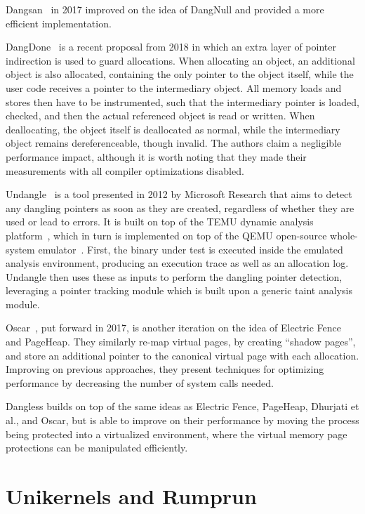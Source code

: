 Dangsan~\cite{dangsan2017} in 2017 improved on the idea of DangNull and provided a more efficient implementation.

DangDone~\cite{dangdone2018} is a recent proposal from 2018 in which an extra layer of pointer indirection is used to guard allocations. When allocating an object, an additional object is also allocated, containing the only pointer to the object itself, while the user code receives a pointer to the intermediary object. All memory loads and stores then have to be instrumented, such that the intermediary pointer is loaded, checked, and then the actual referenced object is read or written. When deallocating, the object itself is deallocated as normal, while the intermediary object remains dereferenceable, though invalid. The authors claim a negligible performance impact, although it is worth noting that they made their measurements with all compiler optimizations disabled.

Undangle~\cite{undangle2012} is a tool presented in 2012 by Microsoft Research that aims to detect any dangling pointers as soon as they are created, regardless of whether they are used or lead to errors. It is built on top of the TEMU dynamic analysis platform~\cite{bitblaze-temu2008}, which in turn is implemented on top of the QEMU open-source whole-system emulator~\cite{qemu-web}. First, the binary under test is executed inside the emulated analysis environment, producing an execution trace as well as an allocation log. Undangle then uses these as inputs to perform the dangling pointer detection, leveraging a pointer tracking module which is built upon a generic taint analysis module.

Oscar~\cite{oscar2017}, put forward in 2017, is another iteration on the idea of Electric Fence and PageHeap. They similarly re-map virtual pages, by creating ``shadow pages'', and store an additional pointer to the canonical virtual page with each allocation. Improving on previous approaches, they present techniques for optimizing performance by decreasing the number of system calls needed.

Dangless builds on top of the same ideas as Electric Fence, PageHeap, Dhurjati et al., and Oscar, but is able to improve on their performance by moving the process being protected into a virtualized environment, where the virtual memory page protections can be manipulated efficiently.

\section{Unikernels and Rumprun}


